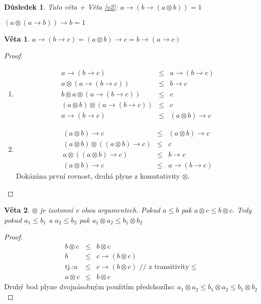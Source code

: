 \documentclass[10pt, a4paper, titlepage]{article}
\theoremstyle{note}
\newtheorem{veta}{Věta}
\newtheorem{dusledek}{Důsledek}
\begin{document}
\begin{dusledek}
Tato věta + Věta \ref{v2}: $a\rightarrow (b\rightarrow (a\otimes b)) = 1$

\hspace{5cm} $(a\otimes (a\rightarrow b))\rightarrow b=1$
\end{dusledek}
\begin{veta}
$a\rightarrow (b\rightarrow c) = (a\otimes b)\rightarrow c = b\rightarrow(a\rightarrow c)$
\end{veta}
\begin{proof}
\begin{enumerate}
\item \begin{eqnarray}
  a\rightarrow(b\rightarrow c)&\leq& a\rightarrow(b\rightarrow c) \nonumber\\
  a\otimes(a\rightarrow(b\rightarrow c))&\leq& b\rightarrow c \nonumber\\
  b\otimes a\otimes(a\rightarrow(b\rightarrow c))&\leq& c \nonumber\\
  (a\otimes b)\otimes(a\rightarrow(b\rightarrow c))&\leq& c \nonumber\\
  a\rightarrow(b\rightarrow c)&\leq& (a\otimes b)\rightarrow c\nonumber
  \end{eqnarray}

\item \begin{eqnarray}
  (a\otimes b) \rightarrow c &\leq &(a\otimes b) \rightarrow c \nonumber\\
  (a\otimes b)\otimes((a\otimes b) \rightarrow c) &\leq &  c \nonumber\\
a\otimes((a\otimes b) \rightarrow c) &\leq & b\rightarrow c \nonumber\\
(a\otimes b) \rightarrow c &\leq & a \rightarrow (b\rightarrow c) \nonumber
  \end{eqnarray}
  Dokázána první rovnost, druhá plyne z komutativity $\otimes$.
\end{enumerate}
\end{proof}
\begin{veta}
$\otimes$ je izotonní v obou argumentech. Pokud $a\leq b$ pak $a\otimes c\leq b\otimes c$. Tedy pokud $a_{1}\leq b_{1}$ a $a_{2}\leq b_{2}$ pak $a_{1}\otimes a_{2}\leq b_{1}\otimes b_{2}$
\end{veta}
\begin{proof}
\begin{eqnarray}
  b\otimes c &\leq&b\otimes c \nonumber\\
  b &\leq& c\rightarrow (b\otimes c) \nonumber\\
  \text{tj.:} a&\leq& c\rightarrow(b\otimes c) \text{  // z transitivity} \leq \nonumber\\
  a\otimes c &\leq&b\otimes c\nonumber
  \end{eqnarray}
Druhý bod plyne dvojnásobným použitím předchozího: $a_{1}\otimes a_{2}\leq b_{1}\otimes a_{2}\leq b_{1}\otimes b_{2}$
\end{proof}
\end{document}
